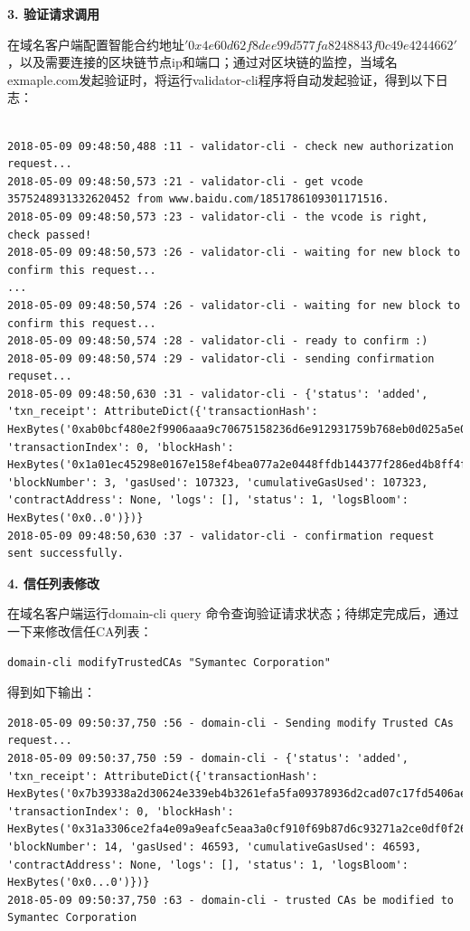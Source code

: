 \noindent\textbf{3. 验证请求调用}

在域名客户端配置智能合约地址$'0x4e60d62f8dee99d577fa8248843f0c49e4244662'$，以及需要连接的区块链节点ip和端口；通过对区块链的监控，当域名exmaple.com发起验证时，将运行validator-cli程序将自动发起验证，得到以下日志：

\begin{lstlisting}

2018-05-09 09:48:50,488 :11 - validator-cli - check new authorization request...
2018-05-09 09:48:50,573 :21 - validator-cli - get vcode 3575248931332620452 from www.baidu.com/1851786109301171516.
2018-05-09 09:48:50,573 :23 - validator-cli - the vcode is right, check passed!
2018-05-09 09:48:50,573 :26 - validator-cli - waiting for new block to confirm this request...
...
2018-05-09 09:48:50,574 :26 - validator-cli - waiting for new block to confirm this request...
2018-05-09 09:48:50,574 :28 - validator-cli - ready to confirm :)
2018-05-09 09:48:50,574 :29 - validator-cli - sending confirmation requset...
2018-05-09 09:48:50,630 :31 - validator-cli - {'status': 'added', 'txn_receipt': AttributeDict({'transactionHash': HexBytes('0xab0bcf480e2f9906aaa9c70675158236d6e912931759b768eb0d025a5e0c20d7'), 'transactionIndex': 0, 'blockHash': HexBytes('0x1a01ec45298e0167e158ef4bea077a2e0448ffdb144377f286ed4b8ff4f3c77a'), 'blockNumber': 3, 'gasUsed': 107323, 'cumulativeGasUsed': 107323, 'contractAddress': None, 'logs': [], 'status': 1, 'logsBloom': HexBytes('0x0..0')})}
2018-05-09 09:48:50,630 :37 - validator-cli - confirmation request sent successfully.

\end{lstlisting}


\noindent\textbf{4. 信任列表修改}

在域名客户端运行domain-cli query 命令查询验证请求状态；待绑定完成后，通过一下来修改信任CA列表：

\begin{lstlisting}
domain-cli modifyTrustedCAs "Symantec Corporation" 
\end{lstlisting}


得到如下输出：

\begin{lstlisting}
2018-05-09 09:50:37,750 :56 - domain-cli - Sending modify Trusted CAs request...
2018-05-09 09:50:37,750 :59 - domain-cli - {'status': 'added', 'txn_receipt': AttributeDict({'transactionHash': HexBytes('0x7b39338a2d30624e339eb4b3261efa5fa09378936d2cad07c17fd5406ae40729'), 'transactionIndex': 0, 'blockHash': HexBytes('0x31a3306ce2fa4e09a9eafc5eaa3a0cf910f69b87d6c93271a2ce0df0f26b955f'), 'blockNumber': 14, 'gasUsed': 46593, 'cumulativeGasUsed': 46593, 'contractAddress': None, 'logs': [], 'status': 1, 'logsBloom': HexBytes('0x0...0')})}
2018-05-09 09:50:37,750 :63 - domain-cli - trusted CAs be modified to Symantec Corporation
\end{lstlisting}

